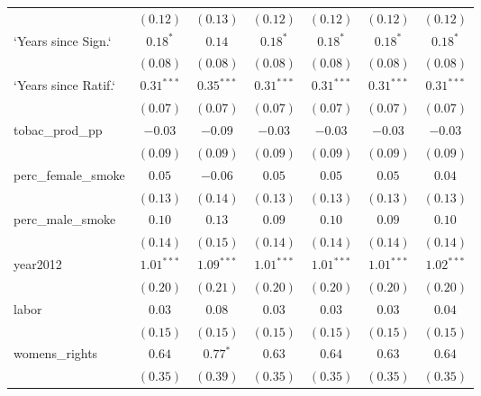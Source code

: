 \begin{table}[!h]
\begin{center}
\begin{tabular}{l c c c c c c }
                        & $(0.12)$     & $(0.13)$     & $(0.12)$     & $(0.12)$     & $(0.12)$     & $(0.12)$     \\
`Years since Sign.`     & $0.18^{*}$   & $0.14$       & $0.18^{*}$   & $0.18^{*}$   & $0.18^{*}$   & $0.18^{*}$   \\
                        & $(0.08)$     & $(0.08)$     & $(0.08)$     & $(0.08)$     & $(0.08)$     & $(0.08)$     \\
`Years since Ratif.`    & $0.31^{***}$ & $0.35^{***}$ & $0.31^{***}$ & $0.31^{***}$ & $0.31^{***}$ & $0.31^{***}$ \\
                        & $(0.07)$     & $(0.07)$     & $(0.07)$     & $(0.07)$     & $(0.07)$     & $(0.07)$     \\
tobac\_prod\_pp         & $-0.03$      & $-0.09$      & $-0.03$      & $-0.03$      & $-0.03$      & $-0.03$      \\
                        & $(0.09)$     & $(0.09)$     & $(0.09)$     & $(0.09)$     & $(0.09)$     & $(0.09)$     \\
perc\_female\_smoke     & $0.05$       & $-0.06$      & $0.05$       & $0.05$       & $0.05$       & $0.04$       \\
                        & $(0.13)$     & $(0.14)$     & $(0.13)$     & $(0.13)$     & $(0.13)$     & $(0.13)$     \\
perc\_male\_smoke       & $0.10$       & $0.13$       & $0.09$       & $0.10$       & $0.09$       & $0.10$       \\
                        & $(0.14)$     & $(0.15)$     & $(0.14)$     & $(0.14)$     & $(0.14)$     & $(0.14)$     \\
year2012                & $1.01^{***}$ & $1.09^{***}$ & $1.01^{***}$ & $1.01^{***}$ & $1.01^{***}$ & $1.02^{***}$ \\
                        & $(0.20)$     & $(0.21)$     & $(0.20)$     & $(0.20)$     & $(0.20)$     & $(0.20)$     \\
labor                   & $0.03$       & $0.08$       & $0.03$       & $0.03$       & $0.03$       & $0.04$       \\
                        & $(0.15)$     & $(0.15)$     & $(0.15)$     & $(0.15)$     & $(0.15)$     & $(0.15)$     \\
womens\_rights          & $0.64$       & $0.77^{*}$   & $0.63$       & $0.64$       & $0.63$       & $0.64$       \\
                        & $(0.35)$     & $(0.39)$     & $(0.35)$     & $(0.35)$     & $(0.35)$     & $(0.35)$     \\

\end{tabular}
\end{center}
\end{table}
